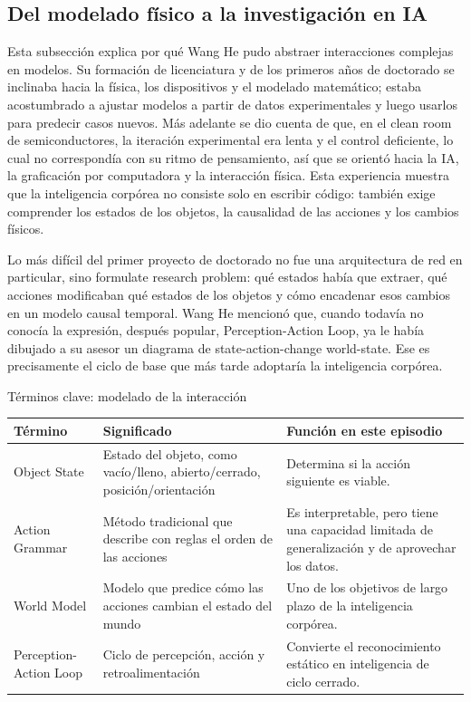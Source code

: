 \subsection{Del modelado físico a la investigación en IA}

Esta subsección explica por qué Wang He pudo abstraer interacciones complejas en modelos. Su formación de licenciatura y de los primeros años de doctorado se inclinaba hacia la física, los dispositivos y el modelado matemático; estaba acostumbrado a ajustar modelos a partir de datos experimentales y luego usarlos para predecir casos nuevos. Más adelante se dio cuenta de que, en el clean room de semiconductores, la iteración experimental era lenta y el control deficiente, lo cual no correspondía con su ritmo de pensamiento, así que se orientó hacia la IA, la graficación por computadora y la interacción física. Esta experiencia muestra que la inteligencia corpórea no consiste solo en escribir código: también exige comprender los estados de los objetos, la causalidad de las acciones y los cambios físicos.

Lo más difícil del primer proyecto de doctorado no fue una arquitectura de red en particular, sino formulate research problem: qué estados había que extraer, qué acciones modificaban qué estados de los objetos y cómo encadenar esos cambios en un modelo causal temporal. Wang He mencionó que, cuando todavía no conocía la expresión, después popular, Perception-Action Loop, ya le había dibujado a su asesor un diagrama de state-action-change world-state. Ese es precisamente el ciclo de base que más tarde adoptaría la inteligencia corpórea.

\begin{knowledgebox}{Términos clave: modelado de la interacción}
\begin{tabularx}{\textwidth}{p{}p{}X}
\toprule
Término & Significado & Función en este episodio \\
\midrule
Object State & Estado del objeto, como vacío/lleno, abierto/cerrado, posición/orientación & Determina si la acción siguiente es viable. \\
Action Grammar & Método tradicional que describe con reglas el orden de las acciones & Es interpretable, pero tiene una capacidad limitada de generalización y de aprovechar los datos. \\
World Model & Modelo que predice cómo las acciones cambian el estado del mundo & Uno de los objetivos de largo plazo de la inteligencia corpórea. \\
Perception-Action Loop & Ciclo de percepción, acción y retroalimentación & Convierte el reconocimiento estático en inteligencia de ciclo cerrado. \\
\bottomrule
\end{tabularx}
\end{knowledgebox}

